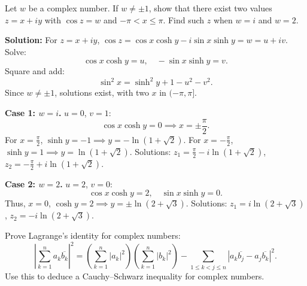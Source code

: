 \begin{problembox}
Let \( w \) be a complex number. If \( w \ne \pm 1 \), show that there exist two values \( z = x + iy \) with \( \cos z = w \) and \( -\pi < x \leq \pi \). Find such \( z \) when \( w = i \) and \( w = 2 \).
\end{problembox}

\textbf{Solution:}
For \( z = x + iy \), \( \cos z = \cos x \cosh y - i \sin x \sinh y = w = u + iv \). Solve:
\[
\cos x \cosh y = u, \quad -\sin x \sinh y = v.
\]
Square and add:
\[
\sin^2 x = \sinh^2 y + 1 - u^2 - v^2.
\]
Since \( w \neq \pm 1 \), solutions exist, with two \( x \) in \( (-\pi, \pi] \).

\textbf{Case 1: \( w = i \).} \( u = 0 \), \( v = 1 \):
\[
\cos x \cosh y = 0 \implies x = \pm \frac{\pi}{2}.
\]
For \( x = \frac{\pi}{2} \), \( \sinh y = -1 \implies y = -\ln(1 + \sqrt{2}) \).
For \( x = -\frac{\pi}{2} \), \( \sinh y = 1 \implies y = \ln(1 + \sqrt{2}) \).
Solutions: \( z_1 = \frac{\pi}{2} - i \ln(1 + \sqrt{2}) \), \( z_2 = -\frac{\pi}{2} + i \ln(1 + \sqrt{2}) \).

\textbf{Case 2: \( w = 2 \).} \( u = 2 \), \( v = 0 \):
\[
\cos x \cosh y = 2, \quad \sin x \sinh y = 0.
\]
Thus, \( x = 0 \), \( \cosh y = 2 \implies y = \pm \ln(2 + \sqrt{3}) \).
Solutions: \( z_1 = i \ln(2 + \sqrt{3}) \), \( z_2 = -i \ln(2 + \sqrt{3}) \).

\begin{problembox}
Prove Lagrange's identity for complex numbers:
\[
\left| \sum_{k=1}^n a_k \overline{b_k} \right|^2 = \left( \sum_{k=1}^n |a_k|^2 \right) \left( \sum_{k=1}^n |b_k|^2 \right) - \sum_{1 \leq k < j \leq n} |a_k \overline{b_j} - a_j \overline{b_k}|^2.
\]
Use this to deduce a Cauchy–Schwarz inequality for complex numbers.
\end{problembox}

